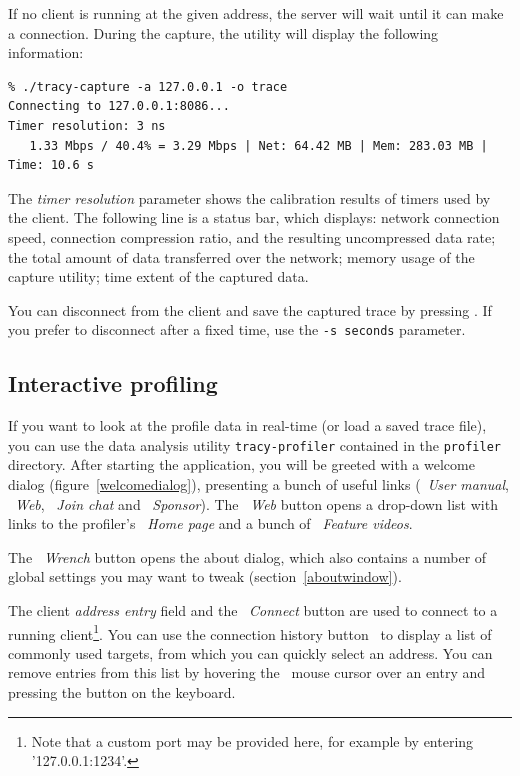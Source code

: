\documentclass[hidelinks,titlepage,a4paper,twoside]{article}
\begin{document}
If no client is running at the given address, the server will wait until it can make a connection. During the capture, the utility will display the following information:

\begin{verbatim}
% ./tracy-capture -a 127.0.0.1 -o trace
Connecting to 127.0.0.1:8086...
Timer resolution: 3 ns
   1.33 Mbps / 40.4% = 3.29 Mbps | Net: 64.42 MB | Mem: 283.03 MB | Time: 10.6 s
\end{verbatim}

The \emph{timer resolution} parameter shows the calibration results of timers used by the client. The following line is a status bar, which displays: network connection speed, connection compression ratio, and the resulting uncompressed data rate; the total amount of data transferred over the network; memory usage of the capture utility; time extent of the captured data.

You can disconnect from the client and save the captured trace by pressing . If you prefer to disconnect after a fixed time, use the \texttt{-s seconds} parameter.

\subsection{Interactive profiling}
\label{interactiveprofiling}

If you want to look at the profile data in real-time (or load a saved trace file), you can use the data analysis utility \texttt{tracy-profiler} contained in the \texttt{profiler} directory. After starting the application, you will be greeted with a welcome dialog (figure~\ref{welcomedialog}), presenting a bunch of useful links (\faBook{}~\emph{User manual}, \faGlobeAmericas{}~\emph{Web}, \faComments~\emph{Join chat} and \faHeart{}~\emph{Sponsor}). The \faGlobeAmericas{}~\emph{Web} button opens a drop-down list with links to the profiler's \emph{\faHome{}~Home page} and a bunch of \emph{\faVideo{}~Feature videos}.

The \emph{\faWrench{}~Wrench} button opens the about dialog, which also contains a number of global settings you may want to tweak (section~\ref{aboutwindow}).

The client \emph{address entry} field and the \faWifi{}~\emph{Connect} button are used to connect to a running client\footnote{Note that a custom port may be provided here, for example by entering '127.0.0.1:1234'.}. You can use the connection history button~\faCaretDown{} to display a list of commonly used targets, from which you can quickly select an address. You can remove entries from this list by hovering the \faMousePointer{}~mouse cursor over an entry and pressing the \keys{\del} button on the keyboard.
\end{document}
